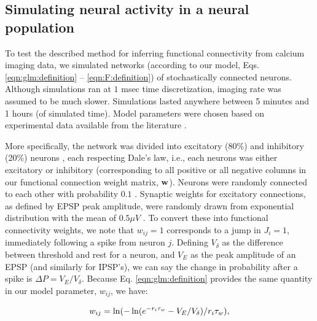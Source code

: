 \subsection{Simulating neural activity in a neural population} \label{sec:results:simulations}

To test the described method for inferring functional connectivity from calcium imaging data, we simulated networks (according to our model, Eqs. \ref{eqn:glm:definition} -- \ref{eqn:F:definition}) of stochastically connected neurons.  Although simulations ran at $1$ msec time discretization, imaging rate was assumed to be much slower. Simulations lasted anywhere between 5 minutes and 1 hours (of simulated time).  Model parameters were chosen based on experimental data available from the literature \cite{Braitenberg1998,Urquijo2000,Lefort2009,Sayer1990}.

More specifically, the network was divided into excitatory (80\%) and inhibitory (20\%) neurons \cite{Braitenberg1998,Urquijo2000}, each respecting Dale's law, i.e., each neurons was either excitatory or inhibitory (corresponding to all positive or all negative columns in our functional connection weight matrix, $\mathbf{w}$). Neurons were randomly connected to each other with probability $0.1$ \cite{Braitenberg1998,Lefort2009}.  Synaptic weights for excitatory connections, as defined by EPSP peak amplitude, were randomly drawn from exponential distribution with the mean of $0.5 \mu V$ \cite{Lefort2009,Sayer1990}. To convert these into functional connectivity weights, we note that $w_{ij}=1$ corresponds to a jump in $J_i=1$, immediately following a spike from neuron $j$.  Defining $V_\delta$ as the difference between threshold and rest for a neuron, and $V_E$ as the peak amplitude of an EPSP (and similarly for IPSP's), we can say the change in probability after a spike is $\Delta P=V_E/V_\delta$. Because Eq. \ref{eqn:glm:definition} provides the same quantity in our model parameter, $w_{ij}$, we have:

\begin{equation}\label{eqn:convert}
\w_{ij}=\ln(-\ln(e^{-r_i\tau_w}-V_E/V_{\delta})/r_i\tau_w),
\end{equation}

